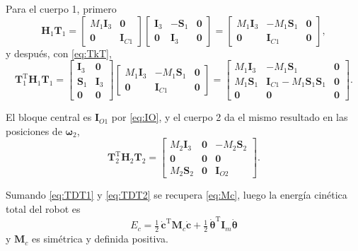 \documentclass[11pt]{article}
\newcommand{\T}{^{\mathrm{T}}}
\newcommand{\wv}{\boldsymbol{\omega}}
\newcommand{\cd}{\dot{\mathbf{c}}}
\newcommand{\IO}[1]{\mathbf{I}_{O#1}}
\newcommand{\IC}[1]{\mathbf{I}_{C#1}}
\newcommand{\thv}{\boldsymbol{\theta}}
\begin{document}
Para el cuerpo 1, primero
\begin{equation}
\mathbf{H}_1\mathbf{T}_1=
\begin{bmatrix}M_1\mathbf{I}_3 & \mathbf{0}\\ \mathbf{0} & \IC{1}\end{bmatrix}
\begin{bmatrix}\mathbf{I}_3 & -\mathbf{S}_1 & \mathbf{0}\\ \mathbf{0} & \mathbf{I}_3 & \mathbf{0}\end{bmatrix}
=\begin{bmatrix}M_1\mathbf{I}_3 & -M_1\mathbf{S}_1 & \mathbf{0}\\ \mathbf{0} & \IC{1} & \mathbf{0}\end{bmatrix},
\label{eq:DT}
\end{equation}
y después, con \eqref{eq:TkT},
\begin{equation}
\mathbf{T}_1\T\mathbf{H}_1\mathbf{T}_1=
\begin{bmatrix}\mathbf{I}_3 & \mathbf{0}\\ \mathbf{S}_1 & \mathbf{I}_3\\ \mathbf{0} & \mathbf{0}\end{bmatrix}
\begin{bmatrix}M_1\mathbf{I}_3 & -M_1\mathbf{S}_1 & \mathbf{0}\\ \mathbf{0} & \IC{1} & \mathbf{0}\end{bmatrix}
=\begin{bmatrix}M_1\mathbf{I}_3 & -M_1\mathbf{S}_1 & \mathbf{0}\\ M_1\mathbf{S}_1 & \IC{1}-M_1\mathbf{S}_1\mathbf{S}_1 & \mathbf{0}\\ \mathbf{0} & \mathbf{0} & \mathbf{0}\end{bmatrix}.
\label{eq:TDT1}
\end{equation}

El bloque central es $\IO{1}$ por \eqref{eq:IO}, y el cuerpo 2 da el mismo resultado en las posiciones de $\wv_2$,
\begin{equation}
\mathbf{T}_2\T\mathbf{H}_2\mathbf{T}_2=
\begin{bmatrix}M_2\mathbf{I}_3 & \mathbf{0} & -M_2\mathbf{S}_2\\ \mathbf{0} & \mathbf{0} & \mathbf{0}\\ M_2\mathbf{S}_2 & \mathbf{0} & \IO{2}\end{bmatrix}.
\label{eq:TDT2}
\end{equation}

Sumando \eqref{eq:TDT1} y \eqref{eq:TDT2} se recupera \eqref{eq:Mc}, luego la energía cinética total del robot es
\begin{equation}
\boxed{\ E_c=\tfrac12\,\cd\T\mathbf{M}_c\cd+\tfrac12\,\dot{\thv}\T\mathbf{I}_m\dot{\thv}\ }
\label{eq:Ec}
\end{equation}
y $\mathbf{M}_c$ es simétrica y definida positiva.
\end{document}
